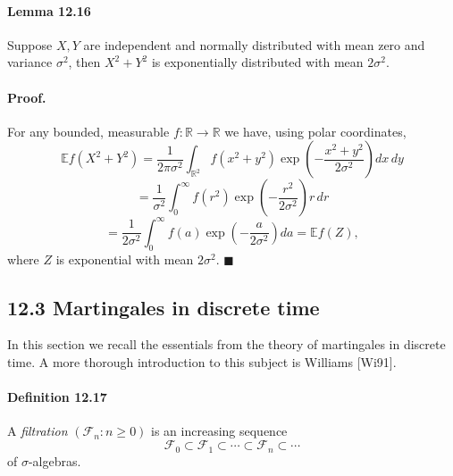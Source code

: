 \documentclass{article}
\begin{document}
\paragraph{Lemma 12.16} Suppose $X, Y$ are independent and normally distributed with mean zero and variance $\sigma^2$, then $X^2 + Y^2$ is exponentially distributed with mean $2\sigma^2$.

\paragraph{Proof.} For any bounded, measurable $f: \mathbb{R} \rightarrow \mathbb{R}$ we have, using polar coordinates,
\[
\mathbb{E}f(X^2 + Y^2) = \frac{1}{2\pi\sigma^2} \int_{\mathbb{R}^2} f(x^2 + y^2) \exp\left(-\frac{x^2 + y^2}{2\sigma^2}\right) dx \, dy
\]
\[
= \frac{1}{\sigma^2} \int_0^{\infty} f(r^2) \exp\left(-\frac{r^2}{2\sigma^2}\right) r \, dr
\]
\[
= \frac{1}{2\sigma^2} \int_0^{\infty} f(a) \exp\left(-\frac{a}{2\sigma^2}\right) da = \mathbb{E}f(Z),
\]
where $Z$ is exponential with mean $2\sigma^2$. \hfill $\blacksquare$

\subsection*{12.3 Martingales in discrete time}

In this section we recall the essentials from the theory of martingales in discrete time. A more thorough introduction to this subject is Williams [Wi91].

\paragraph{Definition 12.17} A \textit{filtration} $(\mathcal{F}_n : n \geq 0)$ is an increasing sequence
\[
\mathcal{F}_0 \subset \mathcal{F}_1 \subset \cdots \subset \mathcal{F}_n \subset \cdots
\]
of $\sigma$-algebras.
\end{document}
